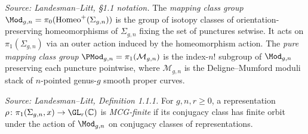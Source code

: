 \begin{definition}
  \label{def:mapping-class-group}
  \textit{Source: Landesman--Litt, §1.1 notation.}
  The \emph{mapping class group} $\Mod_{g,n} = \pi_0(\mathrm{Homeo}^+(\Sigma_{g,n}))$
  is the group of isotopy classes of orientation-preserving homeomorphisms of
  $\Sigma_{g,n}$ fixing the set of punctures setwise.
  It acts on $\pi_1(\Sigma_{g,n})$ via an outer action induced by the
  homeomorphism action.
  The \emph{pure mapping class group}
  $\PMod_{g,n} = \pi_1(\mathcal{M}_{g,n})$
  is the index-$n!$ subgroup of $\Mod_{g,n}$ preserving each puncture
  pointwise, where $\mathcal{M}_{g,n}$ is the Deligne--Mumford moduli stack
  of $n$-pointed genus-$g$ smooth proper curves.
\end{definition}

\begin{definition}
  \label{def:mcg-finite}
  \textit{Source: Landesman--Litt, Definition 1.1.1.}
  For $g, n, r \geq 0$, a representation
  $\rho\colon \pi_1(\Sigma_{g,n}, x) \to \GL_r(\mathbb{C})$ is
  \emph{MCG-finite} if its conjugacy class has finite orbit under the action
  of $\Mod_{g,n}$ on conjugacy classes of representations.
\end{definition}


